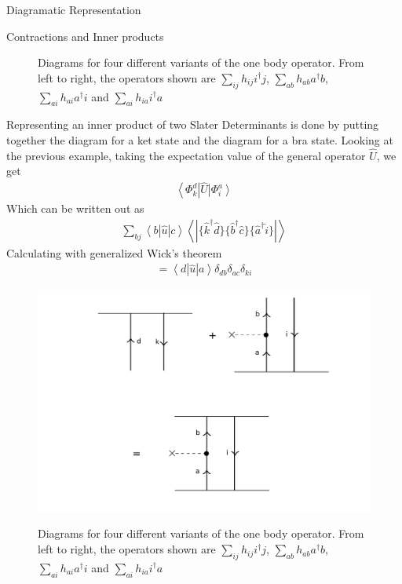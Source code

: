 \documentclass[twoside,english]{uiofysmaster}
\begin{document}
\begin{chapter}{Diagramatic Representation}
\begin{section}{Contractions and Inner products}
\begin{figure}[H]
			\label{Contraction}
			\caption{Diagrams for four different variants of the one body operator. From left to right, the operators shown are $\sum_{ij} h_{ij} i^\dagger j $, $\sum_{ab} h_{ab} a^\dagger b$, $\sum_{ai}h_{ai} a^\dagger i$ and $\sum_{ai} h_{ia} i^\dagger a$}
		\end{figure}
		Representing an inner product of two Slater Determinants is done by putting together the diagram for a ket state and the diagram for a bra state. Looking at the previous example, taking the expectation value of the general operator $\hat U$, we get 
		\begin{align}
			\left< \Phi_k^d \right| \hat U \left| \Phi_i^a \right>
		\end{align}
		Which can be written out as
		\begin{align}
			\sum_{bj} \left< b | \hat u | c \right> \left< \right. | \{ \hat k^\dagger \hat d \} \{ \hat b^\dagger \hat c \} \{ \hat a^\dagger \hat i \} | \left. \right>
		\end{align}
		Calculating with generalized Wick's theorem
		\begin{align}
			= \left< d | \hat u | a \right> \delta_{db} \delta_{ac} \delta_{ki}
		\end{align}
		\begin{figure}[H]
			\includegraphics[width=\textwidth]{Figures/InnerProduct.pdf}
			\label{InnerProduct}
			\caption{Diagrams for four different variants of the one body operator. From left to right, the operators shown are $\sum_{ij} h_{ij} i^\dagger j $, $\sum_{ab} h_{ab} a^\dagger b$, $\sum_{ai}h_{ai} a^\dagger i$ and $\sum_{ai} h_{ia} i^\dagger a$}
		\end{figure}
	\end{section}
	

\end{chapter}
\end{document}
